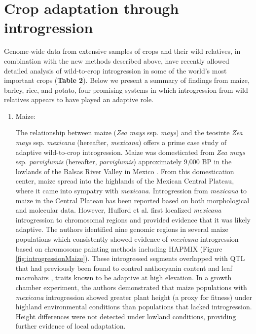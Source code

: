 \documentclass[11pt]{article}
\begin{document}
\section*{Crop adaptation through introgression}

Genome-wide data from extensive samples of crops and their wild relatives, in combination with the new methods described above, have recently allowed detailed analysis of wild-to-crop introgression in some of the world's most important crops (\textbf{Table 2}).
Below we present a summary of findings from maize, barley, rice, and potato, four promising systems in which introgression from wild relatives appears to have played an adaptive role.

\begin{enumerate}
\item{Maize:}

The relationship between maize (\emph{Zea mays} ssp. \emph{mays}) and the teosinte \emph{Zea mays} ssp. \emph{mexicana} (hereafter, \emph{mexicana}) offers a prime case study of adaptive wild-to-crop introgression.
Maize was domesticated from \emph{Zea mays} ssp. \emph{parviglumis} (hereafter, \emph{parviglumis})  approximately 9,000 BP in the lowlands of the Balsas River Valley in Mexico \cite{matsuoka2002single}.
From this domestication center, maize spread into the highlands of the Mexican Central Plateau, where it came into sympatry with \emph{mexicana}.
Introgression from \emph{mexicana} to maize in the Central Plateau has been reported based on both morphological \cite {wilkes1977} and molecular \cite{vanHeerwaarden2011, doebley1987} data.
However, Hufford et al. \cite{Hufford2013} first localized \emph{mexicana} introgression to chromosomal regions and provided evidence that it was likely adaptive.
The authors identified nine genomic regions in several maize populations which consistently showed evidence of \emph{mexicana} introgression based on chromosome painting methods including HAPMIX (Figure \ref{fig:introgressionMaize}).
These introgressed segments overlapped with QTL that had previously been found to control anthocyanin content and leaf macrohairs \cite{lauter2004}, traits known to be adaptive at high elevation.
In a growth chamber experiment, the authors demonstrated that maize populations with \emph{mexicana} introgression showed greater plant height (a proxy for fitness) under highland environmental conditions than populations that lacked introgression.
Height differences were not detected under lowland conditions, providing further evidence of local adaptation.



\end{enumerate}
\end{document}
